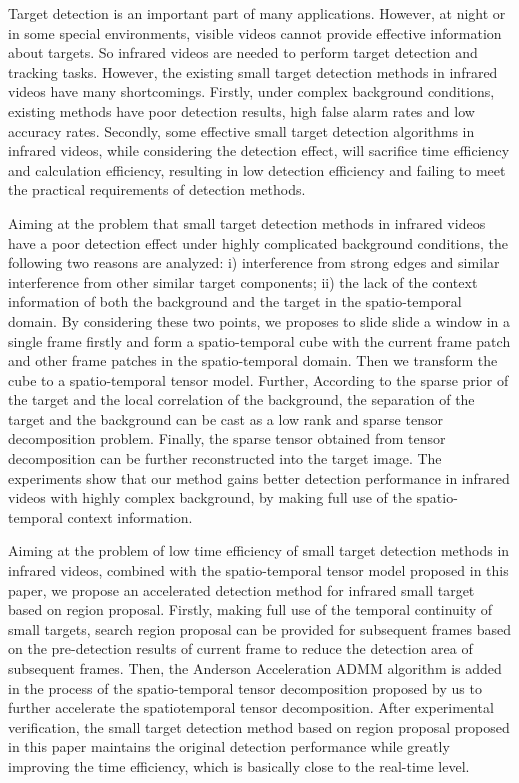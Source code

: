 \begin{englishabstract}

   Target detection is an important part of many applications. However, at night or in some special environments, visible videos cannot provide effective information about targets. So infrared videos are needed to perform target detection and tracking tasks. However, the existing small target detection methods in infrared videos have many shortcomings. Firstly, under complex background conditions, existing methods have poor detection results, high false alarm rates and low accuracy rates. Secondly, some effective small target detection algorithms in infrared videos, while considering the detection effect, will sacrifice time efficiency and calculation efficiency, resulting in low detection efficiency and failing to meet the practical requirements of detection methods.

   Aiming at the problem that small target detection methods in infrared videos have a poor detection effect under highly complicated background conditions, the following two reasons are analyzed: i) interference from strong edges and similar interference from other similar target components; ii) the lack of the context information of both the background and the target in the spatio-temporal domain. By considering these two points, we proposes to slide slide a window in a single frame firstly and form a spatio-temporal cube with the current frame patch and other frame patches in the spatio-temporal domain. Then we transform the cube to a spatio-temporal tensor model. Further, According to the sparse prior of the target and the local correlation of the background, the separation of the target and the background can be cast as a low rank and sparse tensor decomposition problem. Finally, the sparse tensor obtained from tensor decomposition can be further reconstructed into the target image. The experiments show that our method gains better detection performance in infrared videos with highly complex background, by making full use of the spatio-temporal context information.

   Aiming at the problem of low time efficiency of small target detection methods in infrared videos, combined with the spatio-temporal tensor model proposed in this paper, we propose an accelerated detection method for infrared small target based on region proposal. Firstly, making full use of the temporal continuity of small targets, search region proposal can be provided for subsequent frames based on the pre-detection results of current frame to reduce the detection area of subsequent frames. Then, the Anderson Acceleration ADMM algorithm is added in the process of the spatio-temporal tensor decomposition proposed by us to further accelerate the spatiotemporal tensor decomposition. After experimental verification, the small target detection method based on region proposal proposed in this paper maintains the original detection performance while greatly improving the time efficiency, which is basically close to the real-time level.
   

\end{englishabstract}
